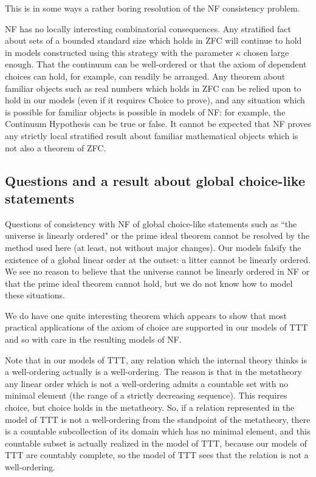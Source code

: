 \documentclass{article}
\theoremstyle{definition}
\theoremstyle{remark}
\begin{document}
{This is in some ways a rather boring resolution of the NF consistency problem.

NF has no locally interesting combinatorial consequences.   Any stratified fact about sets of a bounded standard size which holds in ZFC will continue to hold in models constructed using this strategy with the parameter $\kappa$ chosen large enough.
That the continuum can be well-ordered or that the axiom of dependent choices can hold, for example, can readily be arranged.  Any theorem about familiar objects such as real numbers which holds in ZFC can be relied upon to hold in our models
(even if it requires Choice to prove), and any situation which is possible for familiar objects is possible in models of NF:  for example, the Continuum Hypothesis can be true or false.  It cannot be expected that NF proves any strictly local stratified result about familiar mathematical objects which is not also a theorem of ZFC.

\subsection{Questions and a result about global choice-like statements}

Questions of consistency with NF of global choice-like statements such as ``the universe is linearly ordered"  or the prime ideal theorem cannot be resolved by the method used here (at least, not without major changes).  Our models falsify the existence of a global linear order at the outset:  a litter cannot be linearly ordered.  We see no reason to believe that the universe cannot be linearly ordered in NF or that the prime ideal theorem cannot hold, but we do not know how to model these situations.

We do have one quite interesting theorem which appears to show that most practical applications of the axiom of choice are supported in our models of TTT and so with care in the resulting models of NF.

Note that in our models of TTT, any relation which the internal theory thinks is a well-ordering actually is a well-ordering.
The reason is that in the metatheory any linear order which is not a well-ordering admits a countable set with no minimal element (the range of a strictly decreasing sequence).  This requires choice, but choice holds in the metatheory.  So, if a relation represented in the model of TTT is not a well-ordering from the standpoint of the metatheory, there is a countable subcollection of its domain which has no minimal element, and this countable subset is actually realized in the model of TTT, because our models of TTT are countably complete, so the model of TTT sees that the relation is not a well-ordering.

}
\end{document}
